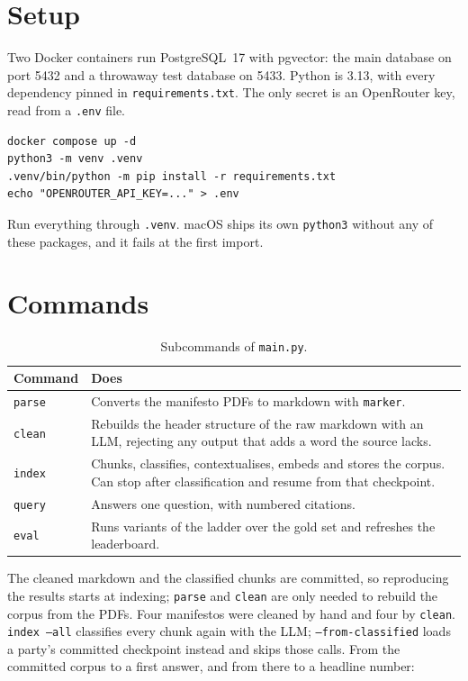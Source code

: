 \section{Setup} \label{sec:tooling-setup}

Two Docker containers run PostgreSQL~17 with pgvector: the main database on
port 5432 and a throwaway test database on 5433. Python is 3.13, with every
dependency pinned in \texttt{requirements.txt}. The only secret is an
OpenRouter key, read from a \texttt{.env} file.

{\small
\begin{verbatim}
docker compose up -d
python3 -m venv .venv
.venv/bin/python -m pip install -r requirements.txt
echo "OPENROUTER_API_KEY=..." > .env
\end{verbatim}
}

Run everything through \texttt{.venv}. macOS ships its own \texttt{python3}
without any of these packages, and it fails at the first import.

\section{Commands} \label{sec:tooling-cli}

\begin{table}[h]
    \centering
    \small
    \begin{tabularx}{\textwidth}{|l|X|}
        \hline
        \textbf{Command} & \textbf{Does} \\
        \hline
        \texttt{parse} & Converts the manifesto PDFs to markdown with \texttt{marker}. \\
        \texttt{clean} & Rebuilds the header structure of the raw markdown with an LLM, rejecting any output that adds a word the source lacks. \\
        \texttt{index} & Chunks, classifies, contextualises, embeds and stores the corpus. Can stop after classification and resume from that checkpoint. \\
        \texttt{query} & Answers one question, with numbered citations. \\
        \texttt{eval} & Runs variants of the ladder over the gold set and refreshes the leaderboard. \\
        \hline
    \end{tabularx}
    \caption{Subcommands of \texttt{main.py}.}
    \label{tab:tooling-cli}
\end{table}

The cleaned markdown and the classified chunks are committed, so reproducing
the results starts at indexing; \texttt{parse} and \texttt{clean} are only
needed to rebuild the corpus from the PDFs. Four manifestos were cleaned by
hand and four by \texttt{clean}. \texttt{index --all} classifies every chunk
again with the LLM; \texttt{--from-classified} loads a party's committed
checkpoint instead and skips those calls. From the committed corpus to a first
answer, and from there to a headline number:

